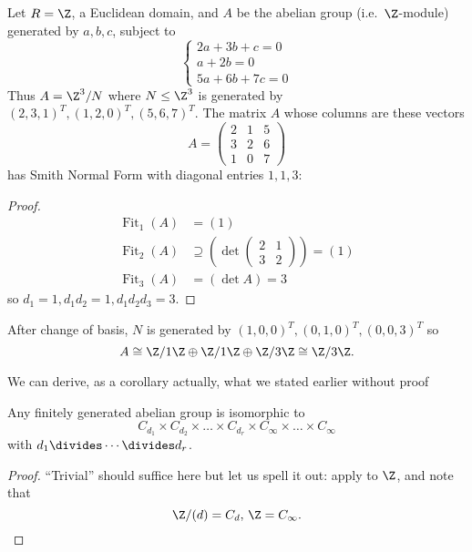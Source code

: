 \documentclass[a4paper]{article}
\theoremstyle{definition}
\DeclareMathOperator{\fit}{Fit}
\begin{document}
\begin{eg}
  Let \(R = \Z\), a Euclidean domain, and \(A\) be the abelian group (i.e.\ \(\Z\)-module) generated by \(a, b, c\), subject to
  \[
    \begin{cases}
      2a + 3b + c = 0 \\
      a + 2b = 0 \\
      5a + 6b + 7c = 0
    \end{cases}
  \]
  Thus \(A = \Z^3/N\) where \(N \leq \Z^3\) is generated by \((2, 3, 1)^T, (1, 2, 0)^T, (5, 6, 7)^T\). The matrix \(A\) whose columns are these vectors
  \[
    A =
    \begin{pmatrix}
      2 & 1 & 5 \\
      3 & 2 & 6 \\
      1 & 0 & 7
    \end{pmatrix}
  \]
  has Smith Normal Form with diagonal entries \(1, 1, 3\):

  \begin{proof}
    \begin{align*}
      \fit_1(A) &= (1) \\
      \fit_2(A) &\supseteq \left( \det
                  \begin{pmatrix}
                    2 & 1 \\
                    3 & 2
                  \end{pmatrix}
                        \right)
                        = (1) \\
      \fit_3(A) &= (\det A) = 3
    \end{align*}
    so \(d_1 = 1, d_1d_2 = 1, d_1d_2d_3 = 3\).
  \end{proof}

  After change of basis, \(N\) is generated by \((1, 0, 0)^T, (0, 1, 0)^T, (0, 0, 3)^T\) so
  \[
    A \cong \Z/1\Z \oplus \Z/1\Z \oplus \Z/3\Z \cong \Z/3\Z.
  \]
\end{eg}

We can derive, as a corollary actually, what we stated earlier without proof

\begin{theorem}
  Any finitely generated abelian group is isomorphic to
  \[
    C_{d_1} \times C_{d_2} \times \dots \times C_{d_r} \times C_\infty \times \dots \times C_\infty
  \]
  with \(d_1 \divides \cdots \divides d_r\).
\end{theorem}

\begin{proof}
  ``Trivial'' should suffice here but let us spell it out: apply  to \(\Z\), and note that
  \[
    \Z/(d) = C_d, \, \Z = C_\infty.
  \]
\end{proof}
\end{document}

